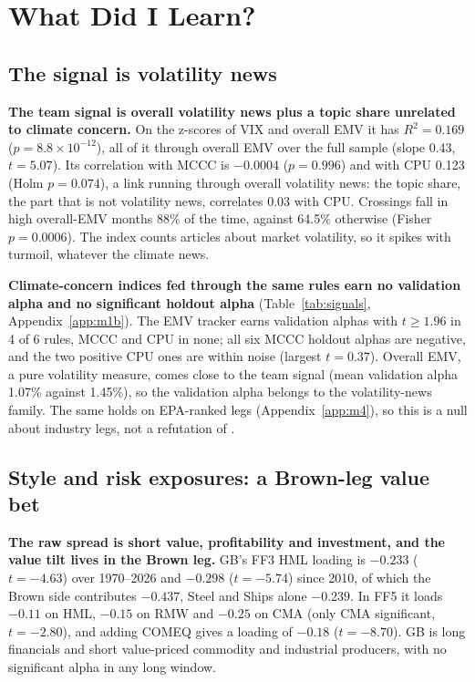 \clearpage
\section{What Did I Learn?}
\label{sec:learn}

\subsection{The signal is volatility news}
\label{sec:signal}

\textbf{The team signal is overall volatility news plus a topic share unrelated to climate concern.} On the z-scores of VIX and overall EMV it has $R^2=0.169$ ($p=8.8\times10^{-12}$), all of it through overall EMV over the full sample (slope 0.43, $t=5.07$). Its correlation with MCCC is $-0.0004$ ($p=0.996$) and with CPU 0.123 (Holm $p=0.074$), a link running through overall volatility news: the topic share, the part that is not volatility news, correlates 0.03 with CPU. Crossings fall in high overall-EMV months 88\% of the time, against 64.5\% otherwise (Fisher $p=0.0006$). The index counts articles about market volatility, so it spikes with turmoil, whatever the climate news.

\textbf{Climate-concern indices fed through the same rules earn no validation alpha and no significant holdout alpha} (Table~\ref{tab:signals}, Appendix~\ref{app:m1b}). The EMV tracker earns validation alphas with $t\ge1.96$ in 4 of 6 rules, MCCC and CPU in none; all six MCCC holdout alphas are negative, and the two positive CPU ones are within noise (largest $t=0.37$). Overall EMV, a pure volatility measure, comes close to the team signal (mean validation alpha 1.07\% against 1.45\%), so the validation alpha belongs to the volatility-news family. The same holds on EPA-ranked legs (Appendix~\ref{app:m4}), so this is a null about industry legs, not a refutation of \citet{pst2022}.

\subsection{Style and risk exposures: a Brown-leg value bet}
\label{sec:exposures}

\textbf{The raw spread is short value, profitability and investment, and the value tilt lives in the Brown leg.} GB's FF3 HML loading is $-0.233$ ($t=-4.63$) over 1970--2026 and $-0.298$ ($t=-5.74$) since 2010, of which the Brown side contributes $-0.437$, Steel and Ships alone $-0.239$. In FF5 it loads $-0.11$ on HML, $-0.15$ on RMW and $-0.25$ on CMA (only CMA significant, $t=-2.80$), and adding COMEQ gives a loading of $-0.18$ ($t=-8.70$). GB is long financials and short value-priced commodity and industrial producers, with no significant alpha in any long window.

